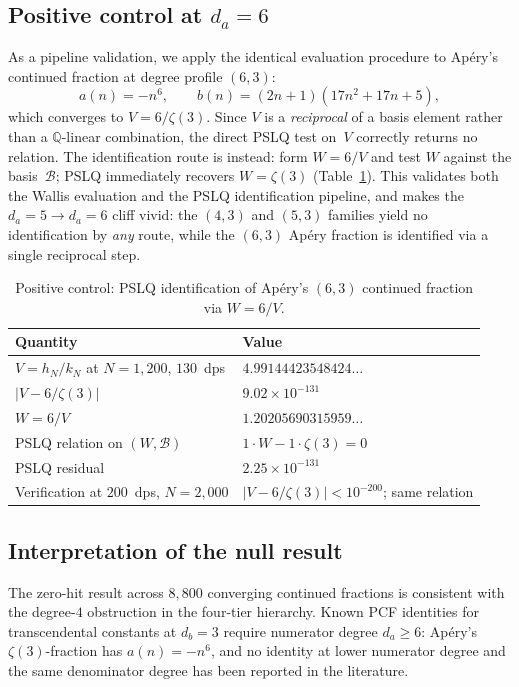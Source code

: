 \documentclass[11pt]{amsart}
\newcommand{\Q}{\mathbb{Q}}
\newcommand{\calB}{\mathcal{B}}
\theoremstyle{plain}
\theoremstyle{remark}
\begin{document}
\subsection{Positive control at $d_a = 6$}\label{sec:control}

As a pipeline validation, we apply the identical evaluation procedure
to Ap\'ery's continued fraction at degree profile $(6,3)$:
\[
  a(n) = -n^6, \qquad
  b(n) = (2n+1)(17n^2 + 17n + 5),
\]
which converges to $V = 6/\zeta(3)$.
Since $V$ is a \emph{reciprocal} of a basis element
rather than a $\Q$-linear combination, the direct PSLQ test
on~$V$ correctly returns no relation.
The identification route is instead: form $W = 6/V$
and test $W$ against the basis~$\calB$;
PSLQ immediately recovers $W = \zeta(3)$
(Table~\ref{tab:control}).
This validates both the Wallis evaluation and the PSLQ
identification pipeline, and makes the
$d_a = 5 \to d_a = 6$ cliff vivid:
the $(4{,}3)$ and $(5{,}3)$ families yield no
identification by \emph{any} route, while the $(6{,}3)$
Ap\'ery fraction is identified via a single reciprocal step.

\begin{table}[ht]
\centering
\caption{Positive control: PSLQ identification of
  Ap\'ery's $(6,3)$ continued fraction via $W = 6/V$.}
\label{tab:control}
\begin{tabular}{@{}ll@{}}
\toprule
Quantity & Value \\
\midrule
$V = h_N/k_N$ at $N = 1{,}200$, $130$~dps
  & $4.99144423548424\ldots$ \\
$|V - 6/\zeta(3)|$
  & $9.02 \times 10^{-131}$ \\
$W = 6/V$
  & $1.20205690315959\ldots$ \\
PSLQ relation on $(W,\calB)$
  & $1 \cdot W - 1 \cdot \zeta(3) = 0$ \\
PSLQ residual
  & $2.25 \times 10^{-131}$ \\
Verification at $200$~dps, $N = 2{,}000$
  & $|V - 6/\zeta(3)| < 10^{-200}$;\; same relation \\
\bottomrule
\end{tabular}
\end{table}

\subsection{Interpretation of the null result}

The zero-hit result across $8{,}800$ converging continued
fractions is consistent with the degree-$4$ obstruction in the
four-tier hierarchy.
Known PCF identities for transcendental constants at $d_b = 3$
require numerator degree $d_a \geq 6$:
Ap\'ery's $\zeta(3)$-fraction has $a(n) = -n^6$,
and no identity at lower numerator degree and the same denominator
degree has been reported in the literature.
\end{document}

